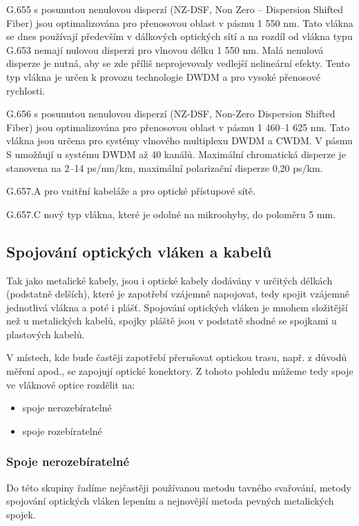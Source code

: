 G.655 s posunutou nenulovou disperzí (NZ-DSF, Non Zero – Dispersion Shifted Fiber) jsou optimalizována pro přenosovou oblast v pásmu 1 550 nm. Tato vlákna se dnes používají především v dálkových optických sítí a na rozdíl od vlákna typu G.653 nemají nulovou disperzi pro vlnovou délku 1 550 nm. Malá nenulová disperze je nutná, aby se zde příliš neprojevovaly vedlejší nelineární efekty. Tento typ vlákna je určen k provozu technologie DWDM a pro vysoké přenosové rychlosti.

G.656 s posunutou nenulovou disperzí (NZ-DSF, Non-Zero Dispersion Shifted Fiber) jsou optimalizována pro přenosovou oblast v pásmu 1 460–1 625 nm. Tato vlákna jsou určena pro systémy vlnového multiplexu DWDM a CWDM. V pásmu S umožňují u systému DWDM až 40 kanálů. Maximální chromatická disperze je stanovena na 2–14 ps/nm/km, maximální polarizační disperze 0,20 ps/km.

G.657.A pro vnitřní kabeláže a pro optické přístupové sítě.

G.657.C nový typ vlákna, které je odolné na mikroohyby, do poloměru 5 mm.

\subsection{Spojování optických vláken a kabelů}
Tak jako metalické kabely, jsou i optické kabely dodávány v určitých délkách (podstatně delších), které je zapotřebí vzájemně napojovat, tedy spojit vzájemně jednotlivá vlákna a poté i plášť. Spojování optických vláken je mnohem složitější než u metalických kabelů, spojky pláště jsou v podstatě shodné se spojkami u plastových kabelů.

V místech, kde bude častěji zapotřebí přerušovat optickou trasu, např. z důvodů měření apod., se zapojují optické konektory. Z tohoto pohledu můžeme tedy spoje ve vláknové optice rozdělit na:
\begin{itemize}
    \item spoje nerozebíratelné
    \item spoje rozebíratelné
\end{itemize}

\subsubsection{Spoje nerozebíratelné}
Do této skupiny řadíme nejčastěji používanou metodu tavného svařování, metody spojování optických vláken lepením a nejnovější metoda pevných metalických spojek. 

